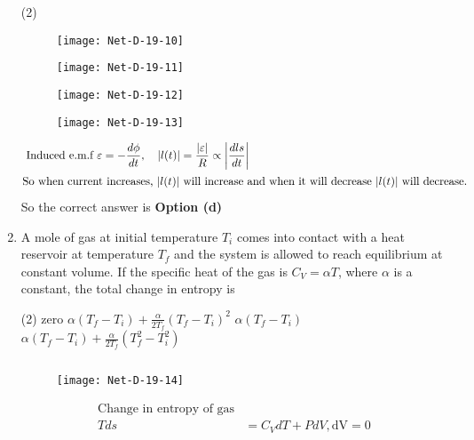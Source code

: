 \begin{enumerate}
 \begin{tasks}(2)
	\task[\textbf{a.}]
	\begin{figure}[H]
		\centering
		\texttt{[image: Net-D-19-10]}
	\end{figure}
	\task[\textbf{b.}]
		\begin{figure}[H]
		\centering
		\texttt{[image: Net-D-19-11]}
	\end{figure}
	\task[\textbf{c.}]
		\begin{figure}[H]
		\centering
		\texttt{[image: Net-D-19-12]}
	\end{figure}
	\task[\textbf{d.}] 
		\begin{figure}[H]
		\centering
		\texttt{[image: Net-D-19-13]}
	\end{figure}
\end{tasks}
\begin{answer}
	\begin{align*}
	\text { Induced e.m.f } \varepsilon&=-\frac{d \phi}{d t}, \quad|l(t)|=\frac{|\varepsilon|}{R} \propto\left|\frac{d l s}{d t}\right|\\
	\intertext{So when current increases, $|l(t)|$ will increase and when it will decrease $|l(t)|$ will decrease.}
	\end{align*}
		So the correct answer is \textbf{Option (d)}
\end{answer}
\item A mole of gas at initial temperature $T_{i}$ comes into contact with a heat reservoir at temperature $T_{f}$ and the system is allowed to reach equilibrium at constant volume. If the specific heat of the gas is $C_{V}=\alpha T$, where $\alpha$ is a constant, the total change in entropy is
 \begin{tasks}(2)
	\task[\textbf{a.}]zero
	\task[\textbf{b.}] $\alpha\left(T_{f}-T_{i}\right)+\frac{\alpha}{2 T_{f}}\left(T_{f}-T_{i}\right)^{2}$
	\task[\textbf{c.}] $\alpha\left(T_{f}-T_{i}\right)$
	\task[\textbf{d.}]$\alpha\left(T_{f}-T_{i}\right)+\frac{\alpha}{2 T_{f}}\left(T_{f}^{2}-T_{i}^{2}\right)$
\end{tasks}
\begin{answer}$\left. \right. $
	\begin{figure}[H]
		\centering
		\texttt{[image: Net-D-19-14]}
	\end{figure}
	\begin{align*}
	\text{Change in entropy of gas}\\
	T d s&=C_{V} d T+P d V, \mathrm{dV}=0 \\

\end{align*}
\end{answer}
\end{enumerate}
